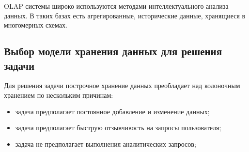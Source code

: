 OLAP-системы широко используются методами интеллектуального анализа данных. В таких базах есть агрегированные, исторические данные, хранящиеся в многомерных схемах.

\subsection{Выбор модели хранения данных для решения задачи}

Для решения задачи построчное хранение данных преобладает над колоночным хранением по нескольким причинам:

\begin{itemize}
    \item задача предполагает постоянное добавление и изменение данных;
    \item задача предполагает быструю отзывчивость на запросы пользователя;
    \item задача не предполагает выполнения аналитических запросов;
\end{itemize}

